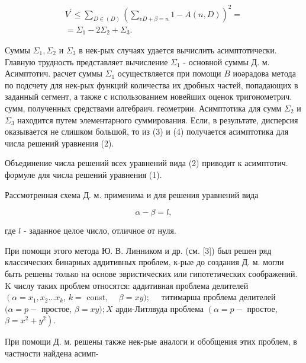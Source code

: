 \documentclass[10pt]{article}
\begin{document}
\[

\begin{gathered}

V^{\prime} \leqslant \sum_{D \in(D)}\left(\sum_{v D+\beta=n} 1-A(n, D)\right)^{2}= \\

=\Sigma_{1}-2 \Sigma_{2}+\Sigma_{3} .

\end{gathered}

\]



Суммы $\Sigma_{1}, \Sigma_{2}$ и $\Sigma_{3}$ в нек-рых случаях удается вычислить асимптотически. Главную трудность представляет вычисление $\Sigma_{1}$ - основной суммы Д. м. Асимптотич. расчет суммы $\Sigma_{1}$ осуществляется при помощи $B$ иоәрадова метода по подсчету для нек-рых функций количества их дробных частей, попадающих в заданный сегмент, а также с использованием новейших оценок тригонометрич. сумм, полученных средствами алгебраич. геометрии. Асимптотика для сумм $\Sigma_{2}$ и $\Sigma_{3}$ находится путем элементарного суммирования. Если, в результате, дисперсия оказывается не слишком большой, то из (3) и (4) получается асимптотика для числа решений уравнения (2).



Объединение числа решений всех уравнений вида (2) приводит к асимптотич. формуле для числа решений уравнения (1).



Рассмотренная схема Д. м. применима и для решения уравнений вида



\[

\alpha-\beta=l,

\]



где $l$ - заданное целое число, отличное от нуля.



При помощи этого метода Ю. В. Линником и др. (см. [3]) был решен ряд классических бинарных аддитивных проблем, к-рые до создания Д. м. могли быть решены только на основе эвристических или гипотетических соображений. $\mathrm{K}$ числу таких проблем относятся: аддитивная проблема делителей $\left(\alpha=x_{1}, x_{2} \ldots x_{k}\right.$, $k=$ const, $\quad \beta=x y) ; \quad$ титимарша проблема делителей $(\alpha=p-$ простое, $\beta=x y) ; X$ арди-Литлвуда проблема $\left(\alpha=p-\right.$ простое, $\left.\beta=x^{2}+y^{2}\right)$.



При помощи Д. м. решены также нек-рые аналоги и обобщения этих проблем, в частности найдена асимп-
\end{document}
